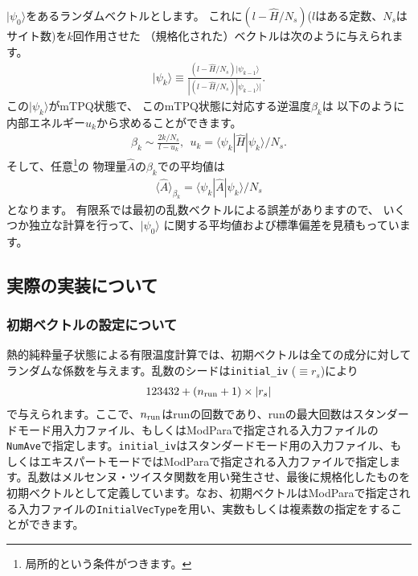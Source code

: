 $|\psi_{0}\rangle$をあるランダムベクトルとします。
これに$(l-\hat{H}/N_{s})$($l$はある定数、$N_{s}$はサイト数)を$k$回作用させた
（規格化された）ベクトルは次のように与えられます。
\begin{align}
|\psi_{k}\rangle \equiv \frac{(l-\hat{H}/N_{s})|\psi_{k-1}\rangle}{|(l-\hat{H}/N_{s})|\psi_{k-1}\rangle|}.
\end{align}
この$|\psi_{k}\rangle$がmTPQ状態で、
このmTPQ状態に対応する逆温度$\beta_{k}$は
以下のように内部エネルギー$u_{k}$から求めることができます。
\begin{align}
\beta_{k}\sim \frac{2k/N_{s}}{l-u_{k}},~~
u_{k} = \langle \psi_{k}|\hat{H}|\psi_{k}\rangle/N_{s}.
\end{align}
そして、任意\footnote{局所的という条件がつきます。}の
物理量$\hat{A}$の$\beta_{k}$での平均値は
\begin{align}
\langle \hat{A}\rangle_{\beta_{k}} =  \langle \psi_{k}|\hat{A}|\psi_{k}\rangle/N_{s}
\end{align}
となります。
有限系では最初の乱数ベクトルによる誤差がありますので、
いくつか独立な計算を行って、$|\psi_{0}\rangle$
に関する平均値および標準偏差を見積もっています。

\subsection{実際の実装について}
\subsubsection*{初期ベクトルの設定について}
熱的純粋量子状態による有限温度計算では、初期ベクトルは全ての成分に対してランダムな係数を与えます。乱数のシードは\verb|initial_iv| ($\equiv r_s$)により
\begin{align}
123432+(n_{\rm run}+1)\times  |r_s|
\end{align}
で与えられます。ここで、$n_{\rm run}$はrunの回数であり、runの最大回数はスタンダードモード用入力ファイル、もしくはModParaで指定される入力ファイルの\verb|NumAve|で指定します。\verb|initial_iv|はスタンダードモード用の入力ファイル、もしくはエキスパートモードではModParaで指定される入力ファイルで指定します。乱数はメルセンヌ・ツイスタ関数を用い発生させ、最後に規格化したものを初期ベクトルとして定義しています。なお、初期ベクトルはModParaで指定される入力ファイルの\verb|InitialVecType|を用い、実数もしくは複素数の指定をすることができます。

